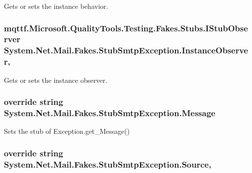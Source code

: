 Gets or sets the instance behavior.

\hypertarget{class_system_1_1_net_1_1_mail_1_1_fakes_1_1_stub_smtp_exception_a828df12f1751a10c27c3d7483c95d2a2}{
\subsubsection[{Instance\-Observer}]{\setlength{\rightskip}{0pt plus 5cm}mqttf.\-Microsoft.\-Quality\-Tools.\-Testing.\-Fakes.\-Stubs.\-I\-Stub\-Observer System.\-Net.\-Mail.\-Fakes.\-Stub\-Smtp\-Exception.\-Instance\-Observer\hspace{0.3cm}{\ttfamily [get]}, {\ttfamily [set]}}}\label{class_system_1_1_net_1_1_mail_1_1_fakes_1_1_stub_smtp_exception_a828df12f1751a10c27c3d7483c95d2a2}


Gets or sets the instance observer.

\hypertarget{class_system_1_1_net_1_1_mail_1_1_fakes_1_1_stub_smtp_exception_acce6cc97e06b64ad1c087974d8485c18}{
\subsubsection[{Message}]{\setlength{\rightskip}{0pt plus 5cm}override string System.\-Net.\-Mail.\-Fakes.\-Stub\-Smtp\-Exception.\-Message\hspace{0.3cm}{\ttfamily [get]}}}\label{class_system_1_1_net_1_1_mail_1_1_fakes_1_1_stub_smtp_exception_acce6cc97e06b64ad1c087974d8485c18}


Sets the stub of Exception.\-get\-\_\-\-Message()

\hypertarget{class_system_1_1_net_1_1_mail_1_1_fakes_1_1_stub_smtp_exception_a41531ca820d13cc29cbdef53e9dcafca}{
\subsubsection[{Source}]{\setlength{\rightskip}{0pt plus 5cm}override string System.\-Net.\-Mail.\-Fakes.\-Stub\-Smtp\-Exception.\-Source\hspace{0.3cm}{\ttfamily [get]}, {\ttfamily [set]}}}\label{class_system_1_1_net_1_1_mail_1_1_fakes_1_1_stub_smtp_exception_a41531ca820d13cc29cbdef53e9dcafca}



